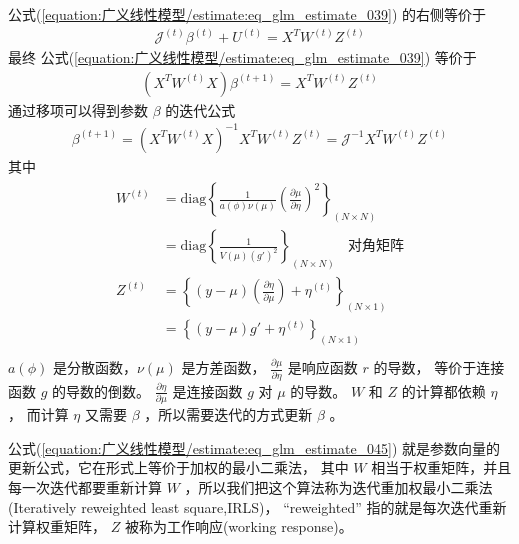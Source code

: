 \documentclass[letterpaper,10pt,english]{sphinxmanual}
\begin{document}
公式(\ref{equation:广义线性模型/estimate:eq_glm_estimate_039}) 的右侧等价于
\begin{equation}\label{equation:广义线性模型/estimate:广义线性模型/estimate:40}
\begin{split}\mathcal{J}^{(t)} \beta^{(t)} +  U^{(t)} = X^T W^{(t)} Z^{(t)}\end{split}
\end{equation}
最终 公式(\ref{equation:广义线性模型/estimate:eq_glm_estimate_039}) 等价于
\begin{equation}\label{equation:广义线性模型/estimate:广义线性模型/estimate:41}
\begin{split}(X^TW^{(t)} X) \beta^{(t+1)} = X^T W^{(t)} Z^{(t)}\end{split}
\end{equation}
通过移项可以得到参数 \(\beta\) 的迭代公式
\begin{equation}\label{equation:广义线性模型/estimate:eq_glm_estimate_045}
\begin{split}\beta^{(t+1)} = (X^TW^{(t)} X)^{-1} X^T W^{(t)} Z^{(t)}
    = \mathcal{J}^{-1} X^T W^{(t)} Z^{(t)}\end{split}
\end{equation}
其中
\begin{align}\label{equation:广义线性模型/estimate:广义线性模型/estimate:42}\!\begin{aligned}
W^{(t)} &= \text{diag} \left \{ \frac{ 1}{ a(\phi) \nu(\mu) }
\left ( \frac{\partial \mu}{\partial \eta} \right )^2
\right \}_{(N \times N)}\\
&= \text{diag} \left \{ \frac{ 1}{ V(\mu) (g')^2}
\right \}_{(N \times N)}  \ \ \ \ \text{对角矩阵}\\
Z^{(t)} &= \left \{ (y-\mu)  \left ( \frac{\partial \eta}{\partial \mu} \right) + \eta^{(t)}
\right \}_{( N \times 1 )}\\
&= \left \{ (y-\mu) g' + \eta^{(t)}
\right \}_{( N \times 1 )}\\
\end{aligned}\end{align}
\(a(\phi)\) 是分散函数，\(\nu(\mu)\) 是方差函数，
\(\frac{\partial \mu}{\partial \eta}\) 是响应函数 \(r\) 的导数，
等价于连接函数 \(g\) 的导数的倒数。
\(\frac{\partial \eta}{\partial \mu}\) 是连接函数 \(g\) 对 \(\mu\) 的导数。
\(W\) 和 \(Z\) 的计算都依赖 \(\eta\) ，
而计算 \(\eta\) 又需要 \(\beta\)
，所以需要迭代的方式更新 \(\beta\) 。

公式(\ref{equation:广义线性模型/estimate:eq_glm_estimate_045}) 就是参数向量的更新公式，它在形式上等价于加权的最小二乘法，
其中 \(W\) 相当于权重矩阵，并且每一次迭代都要重新计算 \(W\)
，所以我们把这个算法称为迭代重加权最小二乘法(Iteratively reweighted least square,IRLS)，
“reweighted” 指的就是每次迭代重新计算权重矩阵，
\(Z\) 被称为工作响应(working response)。
\end{document}
